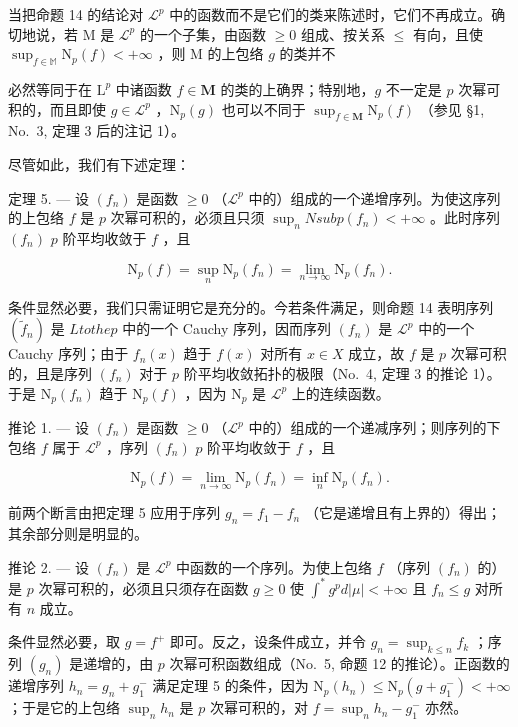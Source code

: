 当把命题 14 的结论对 \(\mathcal{L}^p\) 中的函数而不是它们的类来陈述时，它们不再成立。确切地说，若 M 是 \(\mathcal{L}^p\) 的一个子集，由函数 \(\geqslant 0\) 组成、按关系 \(\leqslant\) 有向，且使 \(\sup_{f\in\mathbb{M}}\mathrm{N}_{p}(f)<+\infty\) ，则 M 的上包络 \(g\) 的类并不

必然等同于在 \(\mathrm{L}^p\) 中诸函数 \(f \in \mathbf{M}\) 的类的上确界；特别地，\(g\) 不一定是 \(p\) 次幂可积的，而且即使 \(g \in \mathcal{L}^p\) ，\(\mathrm{N}_p(g)\) 也可以不同于 \(\sup_{f \in \mathbf{M}} \mathrm{N}_p(f)\) （参见 §1, No.~3, 定理 3 后的注记 1）。

尽管如此，我们有下述定理：

定理 5. --- 设 \((f_n)\) 是函数 \(\geqslant 0\) （\(\mathcal{L}^p\) 中的）组成的一个递增序列。为使这序列的上包络 \(f\) 是 \(p\) 次幂可积的，必须且只须 \(\sup_{n} N sub p(f_n) < +\infty\) 。此时序列 \((f_n)\) \(p\) 阶平均收敛于 \(f\) ，且

\[
\mathrm{N} _ {p} (f) = \sup _ {n} \mathrm{N} _ {p} (f _ {n}) = \lim _ {n \rightarrow \infty} \mathrm{N} _ {p} (f _ {n}).\tag{11}
\]

条件显然必要，我们只需证明它是充分的。今若条件满足，则命题 14 表明序列 \((\tilde{f}_n)\) 是 \(L to the p\) 中的一个 Cauchy 序列，因而序列 \((f_n)\) 是 \(\mathcal{L}^p\) 中的一个 Cauchy 序列；由于 \(f_n(x)\) 趋于 \(f(x)\) 对所有 \(x \in X\) 成立，故 \(f\) 是 \(p\) 次幂可积的，且是序列 \((f_n)\) 对于 \(p\) 阶平均收敛拓扑的极限（No.~4, 定理 3 的推论 1）。于是 \(\mathrm{N}_p(f_n)\) 趋于 \(\mathrm{N}_p(f)\) ，因为 \(\mathrm{N}_p\) 是 \(\mathcal{L}^p\) 上的连续函数。

推论 1. --- 设 \((f_n)\) 是函数 \(\geqslant 0\) （\(\mathcal{L}^p\) 中的）组成的一个递减序列；则序列的下包络 \(f\) 属于 \(\mathcal{L}^p\) ，序列 \((f_n)\) \(p\) 阶平均收敛于 \(f\) ，且

\[
\mathrm{N} _ {p} (f) = \lim _ {n \rightarrow \infty} \mathrm{N} _ {p} (f _ {n}) = \inf _ {n} \mathrm{N} _ {p} (f _ {n}).
\]

前两个断言由把定理 5 应用于序列 \(g_{n} = f_{1} - f_{n}\) （它是递增且有上界的）得出；其余部分则是明显的。

推论 2. --- 设 \((f_n)\) 是 \(\mathcal{L}^p\) 中函数的一个序列。为使上包络 \(f\) （序列 \((f_n)\) 的）是 \(p\) 次幂可积的，必须且只须存在函数 \(g \geqslant 0\) 使 \(\int^{*} g^p d|\mu| < +\infty\) 且 \(f_n \leqslant g\) 对所有 \(n\) 成立。

条件显然必要，取 \(g = f^{+}\) 即可。反之，设条件成立，并令 \(g_{n} = \sup_{k\leqslant n}f_{k}\) ；序列 \((g_{n})\) 是递增的，由 \(p\) 次幂可积函数组成（No.~5, 命题 12 的推论）。正函数的递增序列 \(h_n = g_n + g_1^-\) 满足定理 5 的条件，因为 \(\mathrm{N}_p(h_n)\leqslant \mathrm{N}_p(g + g_1^-) < +\infty\) ；于是它的上包络 \(\sup_{n}h_{n}\) 是 \(p\) 次幂可积的，对 \(f = \sup_{n}h_{n} - g_{1}^{-}\) 亦然。

